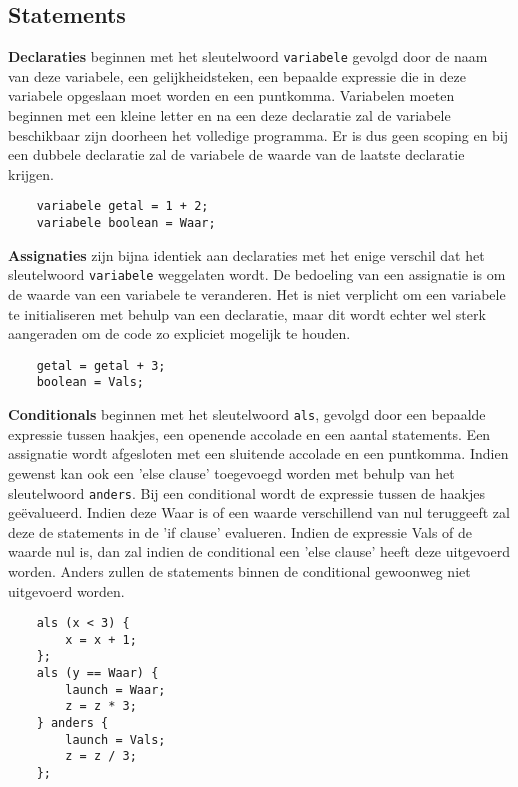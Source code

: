 \documentclass[12pt, titlepage]{article}
\begin{document}
\subsection{Statements}
\label{sec:statements}

\begin{description}

\item{\bf Declaraties} beginnen met het sleutelwoord \texttt{variabele} gevolgd door de naam van deze variabele, een gelijkheidsteken, een bepaalde expressie die in deze variabele opgeslaan moet worden en een puntkomma. Variabelen moeten beginnen met een kleine letter en na een deze declaratie zal de variabele beschikbaar zijn doorheen het volledige programma. Er is dus geen scoping en bij een dubbele declaratie zal de variabele de waarde van de laatste declaratie krijgen.
\newline
\begin{lstlisting}
    variabele getal = 1 + 2;
    variabele boolean = Waar;
\end{lstlisting}
 
 
\item{\bf Assignaties} zijn bijna identiek aan declaraties met het enige verschil dat het sleutelwoord \texttt{variabele} weggelaten wordt. De bedoeling van een assignatie is om de waarde van een variabele te veranderen. Het is niet verplicht om een variabele te initialiseren met behulp van een declaratie, maar dit wordt echter wel sterk aangeraden om de code zo expliciet mogelijk te houden.
\newline
\begin{lstlisting}
    getal = getal + 3;
    boolean = Vals;
\end{lstlisting}

\item{\bf Conditionals} beginnen met het sleutelwoord \texttt{als}, gevolgd door een bepaalde expressie tussen haakjes, een openende accolade en een aantal statements. Een assignatie wordt afgesloten met een sluitende accolade en een puntkomma. Indien gewenst kan ook een 'else clause' toegevoegd worden met behulp van het sleutelwoord \texttt{anders}. Bij een conditional wordt de expressie tussen de haakjes geëvalueerd. Indien deze Waar is of een waarde verschillend van nul teruggeeft zal deze de statements in de 'if clause' evalueren. Indien de expressie Vals of de waarde nul is, dan zal indien de conditional een 'else clause' heeft deze uitgevoerd worden. Anders zullen de statements binnen de conditional gewoonweg niet uitgevoerd worden.
\newline
\begin{lstlisting}
    als (x < 3) {
    	x = x + 1;
    };
    als (y == Waar) {
    	launch = Waar;
    	z = z * 3;
    } anders {
    	launch = Vals;
    	z = z / 3;
    };
\end{lstlisting}


\end{description}
\end{document}
